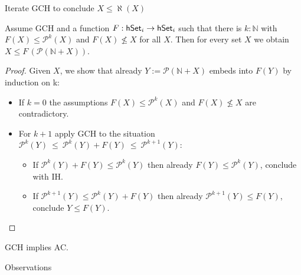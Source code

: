 \documentclass[xcolor=dvipsnames,compress,aspectratio=169,handout]{beamer}
\newcommand{\MBB}[1]{\ensuremath{\mathbb{#1}}\xspace}  %
\newcommand{\MCL}[1]{\ensuremath{\mathcal{#1}}\xspace} %
\newcommand{\Nat}{\MBB{N}}   %
\newcommand{\Pow}{\MCL P}
\begin{document}
\begin{frame}{Iterate GCH to conclude $X\le \aleph(X)$}

	\pause
	\begin{theorem}
		Assume GCH and a function $F:\mathsf{hSet}_i\to\mathsf{hSet}_i$ such that there is $k:\Nat$ with $F(X)\le \Pow^k(X)$ and $F(X)\not\le X$ for all $X$.
		Then for every set $X$ we obtain $X\le F\,(\Pow(\Nat + X))$.
	\end{theorem}
	\vspace{-0.1cm}
	\pause
	\begin{proof}
		\pause
		Given $X$, we show that already $Y:=\Pow(\Nat + X)$ embeds into $F(Y)$ by induction on k:
		\begin{itemize}
			\vspace{0.2cm}
			\pause
			\item
			If $k=0$ the assumptions $F(X)\le \Pow^k(X)$ and $F(X)\not\le X$ are contradictory.
			\vspace{0.2cm}
			\pause
			\item
			For $k+1$ apply GCH to the situation $\Pow^{k}(Y)~\le~ \Pow^{k}(Y)+F(Y)~\le~ \Pow^{k+1}(Y)$:
			\begin{itemize}
			\vspace{0.2cm}
			\pause
			\item
			If $\Pow^{k}(Y)+F(Y)\le \Pow^{k}(Y)$ then already $F(Y)\le \Pow^{k}(Y)$, conclude with IH.
			\vspace{0.2cm}
			\item
			\pause
			If $\Pow^{k+1}(Y)\le \Pow^{k}(Y)+F(Y)$ then already $\Pow^{k+1}(Y)\le F(Y)$, conclude $Y\le F(Y)$.
			\qedhere
			\end{itemize}
		\end{itemize}
	\end{proof}
	\pause
	\vspace{-0.1cm}
	\begin{corollary}
		GCH implies AC.
	\end{corollary}
\end{frame}

\begin{frame}
	\Huge
	\centering
	Observations
\end{frame}
\end{document}
